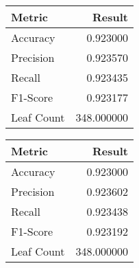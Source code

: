 \begin{tabular}{lr}
\toprule
    Metric &     Result \\
\midrule
  Accuracy &   0.923000 \\
 Precision &   0.923570 \\
    Recall &   0.923435 \\
  F1-Score &   0.923177 \\
Leaf Count & 348.000000 \\
\bottomrule
\end{tabular}
\begin{tabular}{lr}
\toprule
    Metric &     Result \\
\midrule
  Accuracy &   0.923000 \\
 Precision &   0.923602 \\
    Recall &   0.923438 \\
  F1-Score &   0.923192 \\
Leaf Count & 348.000000 \\
\bottomrule
\end{tabular}
